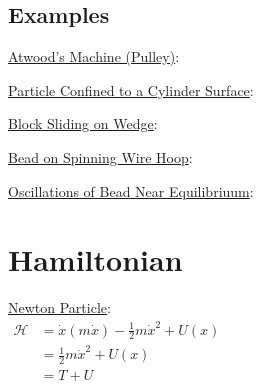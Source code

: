 \documentclass[12pt]{article}
\begin{document}
%
%
%
\newpage
\subsection{Examples}

\vspace{10pt}\noindent
\underline{Atwood's Machine (Pulley)}:

\vspace{20pt}\noindent
\underline{Particle Confined to a Cylinder Surface}:

\vspace{20pt}\noindent
\underline{Block Sliding on Wedge}:

\vspace{20pt}\noindent
\underline{Bead on Spinning Wire Hoop}:

\vspace{20pt}\noindent
\underline{Oscillations of Bead Near Equilibriuum}:

\newpage
\section{Hamiltonian}
\hspace{3cm}
\begin{minipage}[t]{8cm}
    \underline{Newton Particle}:\\[10pt]
    \(\begin{aligned}
        \mathcal{H} &= \dot{x} ( m \dot{x} ) - \tfrac{1}{2} m \dot{x}^2 + U(x) \\[5pt]
        &= \tfrac{1}{2} m \dot{x}^2 + U(x)\\[5pt]
        &= T + U
    \end{aligned}\)    
\end{minipage}
\end{document}
